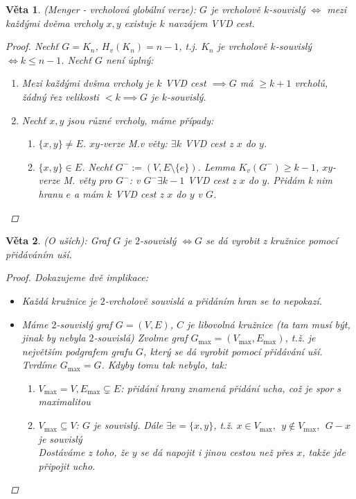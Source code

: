 \documentclass[10pt,a4paper]{article}
\newtheorem{veta}{Věta}
\begin{document}
\begin{veta} (Menger - vrcholová globální verze): \normalfont
    $G$ je vrcholově $k$-souvislý $\iff$ mezi každými dvěma vrcholy $x,y$ existuje $k$ navzájem VVD cest.

    \begin{proof}
        Nechť $G = K_n$, $H_v(K_n)=n-1$, t.j. $K_n$ je vrcholově $k$-souvislý $\iff k \leq n-1$. Nechť $G$ není úplný:
        \begin{enumerate}
            \item [$\implies$] Mezi každými dvšma vrcholy je $k$ VVD cest $\implies G$ má $\geq k+1$ vrcholů, žádný řez velikosti $<k \implies G$ je $k$-souvislý.
            \item [$\Longleftarrow$] Nechť $x,y$ jsou různé vrcholy, máme případy:
                \begin{enumerate}
                    \item $\{x,y\} \neq E$. $xy$-verze M.v věty: $\exists k$ VVD cest z $x$ do $y$.
                    \item $\{x,y\} \in E$. Nechť $G^-:=(V, E\setminus\{e\})$. Lemma $K_v(G^-) \geq k-1$, $xy$-verze M. věty pro $G^-$: v $G^- \exists k-1$ VVD cest z $x$ do $y$.
                    Přidám k nim hranu $e$ a mám $k$ VVD cest z $x$ do $y$ v $G$.
                \end{enumerate} 
        \end{enumerate}
    \end{proof}
\end{veta}

\begin{veta} (O uších): \normalfont
    Graf $G$ je $2$-souvislý $\iff G$ se dá vyrobit z kružnice pomocí přidáváním uší.
    \begin{proof}
        Dokazujeme dvě implikace:
        \begin{itemize}
            \item [$\Longleftarrow$] Každá kružnice je $2$-vrcholově souvislá a přidáním hran se to nepokazí.
            \item [$\implies$] Máme $2$-souvislý graf $G=(V,E)$, $C$ je libovolná kružnice (ta tam musí být, jinak by nebyla $2$-souvislá) 
            Zvolme graf $G_{\max}=(V_{\max}, E_{\max})$, t.ž. je největším podgrafem grafu $G$, který se dá vyrobit pomocí přidávání uší. Tvrdíme $G_{\max}=G$. Kdyby tomu tak nebylo, tak:
            \begin{enumerate}
                \item $V_{\max}=V, E_{\max}\subsetneq E$: přidání hrany znamená přidání ucha, což je spor s maximalitou
                \item $V_{\max} \subseteq V$: $G$ je souvislý. Dále $\exists e =\{x,y\}$, t.ž. $x \in V_{\max}, ~~y \notin V_{\max}, ~~G-x$ je souvislý\\ Dostáváme z toho, že $y$ se dá napojit i jinou cestou než přes $x$, takže jde připojit ucho.
            \end{enumerate}
        \end{itemize}
    \end{proof}
\end{veta}
\end{document}
